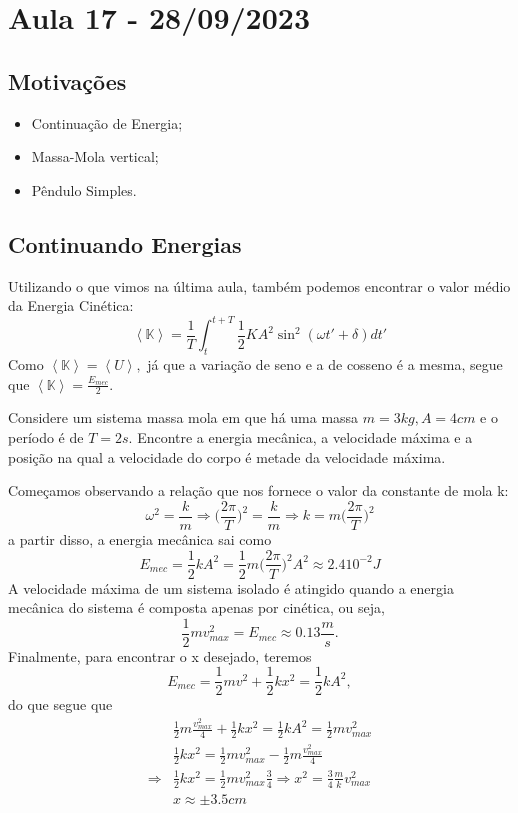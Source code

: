 \documentclass[PhysicsII/physicsII_notes.tex]{subfiles}
\begin{document}
\section{Aula 17 - 28/09/2023}
\subsection{Motivações}
\begin{itemize}
	\item Continuação de Energia;
	\item Massa-Mola vertical;
	\item Pêndulo Simples.
\end{itemize}
\subsection{Continuando Energias}
Utilizando o que vimos na última aula, também podemos encontrar o valor médio da Energia Cinética:
\[
	\left< \mathbb{K} \right> = \frac{1}{T}\int_{t}^{t+T}\frac{1}{2}KA^{2}\sin^{2}{(\omega t'+\delta )}dt'
\]
Como \(\left< \mathbb{K} \right> = \left< U \right>,\) já que a variação de seno e a de cosseno é a mesma, segue que \(\left< \mathbb{K} \right> = \frac{E_{mec}}{2}\).
\begin{example}
	Considere um sistema massa mola em que há uma massa \(m=3kg, A = 4cm\) e o período é de \(T=2s\). Encontre a energia mecânica, a velocidade máxima e a posição na qual
	a velocidade do corpo é metade da velocidade máxima.

	Começamos observando a relação que nos fornece o valor da constante de mola k:
	\[
		\omega ^{2} = \frac{k}{m} \Rightarrow \biggl(\frac{2\pi }{T}\biggr)^{2} = \frac{k}{m} \Rightarrow k = m \biggl(\frac{2\pi }{T}\biggr)^{2}
	\]
	a partir disso, a energia mecânica sai como
	\[
		E_{mec} = \frac{1}{2}kA^{2} = \frac{1}{2}m \biggl(\frac{2\pi }{T}\biggr)^{2}A^{2}\approx 2.4 10^{-2}J
	\]
	A velocidade máxima de um sistema isolado é atingido quando a energia mecânica do sistema é composta apenas por cinética, ou seja,
	\[
		\frac{1}{2}mv_{max}^{2} = E_{mec}\approx 0.13\frac{m}{s}.
	\]
	Finalmente, para encontrar o x desejado, teremos
	\[
		E_{mec} = \frac{1}{2}mv^{2} + \frac{1}{2}kx^{2} = \frac{1}{2}kA^{2},
	\]
	do que segue que
	\begin{align*}
		            & \frac{1}{2}m \frac{v_{max}^{2}}{4} + \frac{1}{2}kx^{2} = \frac{1}{2} kA^{2} = \frac{1}{2}mv_{max}^{2}        \\
		            & \frac{1}{2}kx^{2}=\frac{1}{2}mv_{max}^{2}-\frac{1}{2}m \frac{v_{max}^{2}}{4}                                 \\
		\Rightarrow & \frac{1}{2}kx^{2} = \frac{1}{2}mv_{max}^{2}\frac{3}{4} \Rightarrow x^{2} = \frac{3}{4}\frac{m}{k}v_{max}^{2} \\
		            & x\approx\pm 3.5cm
	\end{align*}
\end{example}
\end{document}
